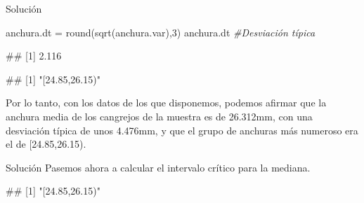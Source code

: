 \documentclass[
  ignorenonframetext,
  aspectratio=169]{beamer}
\newenvironment{Shaded}{\begin{snugshade}}{\end{snugshade}}
\newcommand{\CommentTok}[1]{\textcolor[rgb]{0.56,0.35,0.01}{\textit{#1}}}
\newcommand{\DecValTok}[1]{\textcolor[rgb]{0.00,0.00,0.81}{#1}}
\newcommand{\FloatTok}[1]{\textcolor[rgb]{0.00,0.00,0.81}{#1}}
\newcommand{\FunctionTok}[1]{\textcolor[rgb]{0.00,0.00,0.00}{#1}}
\newcommand{\NormalTok}[1]{#1}
\newcommand{\OtherTok}[1]{\textcolor[rgb]{0.56,0.35,0.01}{#1}}
\newcommand{\SpecialCharTok}[1]{\textcolor[rgb]{0.00,0.00,0.00}{#1}}
\let\oldverbatim\verbatim
\let\endoldverbatim\endverbatim
\renewenvironment{verbatim}{\tiny\oldverbatim}{\endoldverbatim}
\begin{document}
\begin{frame}[fragile]{Solución}
\protect\hypertarget{soluciuxf3n-32}{}
\begin{Shaded}
\begin{Highlighting}[]
\NormalTok{anchura.dt }\OtherTok{=} \FunctionTok{round}\NormalTok{(}\FunctionTok{sqrt}\NormalTok{(anchura.var),}\DecValTok{3}\NormalTok{)}
\NormalTok{anchura.dt }\CommentTok{\#Desviación típica}
\end{Highlighting}
\end{Shaded}

\begin{verbatim}
## [1] 2.116
\end{verbatim}

\begin{Shaded}
\end{Shaded}

\begin{verbatim}
## [1] "[24.85,26.15)"
\end{verbatim}

Por lo tanto, con los datos de los que disponemos, podemos afirmar que
la anchura media de los cangrejos de la muestra es de 26.312mm, con una
desviación típica de unos 4.476mm, y que el grupo de anchuras más
numeroso era el de {[}24.85,26.15).
\end{frame}

\begin{frame}[fragile]{Solución}
\protect\hypertarget{soluciuxf3n-33}{}
Pasemos ahora a calcular el intervalo crítico para la mediana.

\begin{Shaded}
\end{Shaded}

\begin{verbatim}
## [1] "[24.85,26.15)"
\end{verbatim}
\end{frame}
\end{document}
